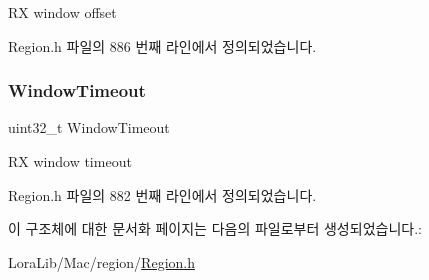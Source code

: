 RX window offset 

Region.\+h 파일의 886 번째 라인에서 정의되었습니다.

\mbox{\label{structs_rx_config_params_a9d9f6c16ea62e2bcc09b100e2cb83e3f}} 
\subsubsection{\texorpdfstring{Window\+Timeout}{WindowTimeout}}
{\footnotesize\ttfamily uint32\+\_\+t Window\+Timeout}

RX window timeout 

Region.\+h 파일의 882 번째 라인에서 정의되었습니다.



이 구조체에 대한 문서화 페이지는 다음의 파일로부터 생성되었습니다.\+:\begin{DoxyCompactItemize}
\item 
Lora\+Lib/\+Mac/region/\mbox{\hyperlink{_region_8h}{Region.\+h}}\end{DoxyCompactItemize}
